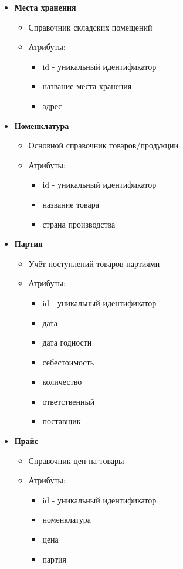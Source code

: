 \begin{itemize}
	\item \textbf{Места хранения}
	\begin{itemize}
		\item Справочник складских помещений
		\item Атрибуты:
		\begin{itemize}
			\item id - уникальный идентификатор
			\item название места хранения
			\item адрес
		\end{itemize}
	\end{itemize}
	
	\item \textbf{Номенклатура}
	\begin{itemize}
		\item Основной справочник товаров/продукции
		\item Атрибуты:
		\begin{itemize}
			\item id - уникальный идентификатор
			\item название товара
			\item страна производства
		\end{itemize}
	\end{itemize}
	
	\item \textbf{Партия}
	\begin{itemize}
		\item Учёт поступлений товаров партиями
		\item Атрибуты:
		\begin{itemize}
			\item id - уникальный идентификатор
			\item дата
			\item дата годности
			\item себестоимость
			\item количество
			\item ответственный
			\item поставщик
		\end{itemize}
	\end{itemize}
	
	\item \textbf{Прайс}
	\begin{itemize}
		\item Справочник цен на товары
		\item Атрибуты:
		\begin{itemize}
			\item id - уникальный идентификатор
			\item номенклатура
			\item цена
			\item партия
		\end{itemize}
	\end{itemize}
	
\end{itemize}
